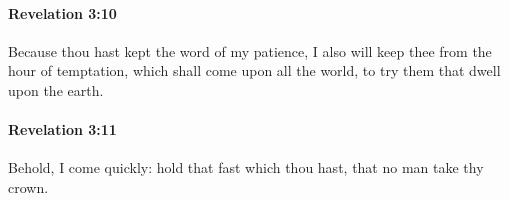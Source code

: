 		\paragraph{Revelation 3:10} %
			\label{REVELATIONNT-3-10}

			Because thou hast kept the word of my patience, I also will keep thee from the hour of temptation, which shall come upon all the world, to try them that dwell upon the earth.

			\begin{framed}
			\scriptsize
				\begin{compactdesc}
					\item[SBLG] 
				\end{compactdesc}
			\end{framed}

		\paragraph{Revelation 3:11} %
			\label{REVELATIONNT-3-11}

			Behold, I come quickly: hold that fast which thou hast, that no man take thy crown.

